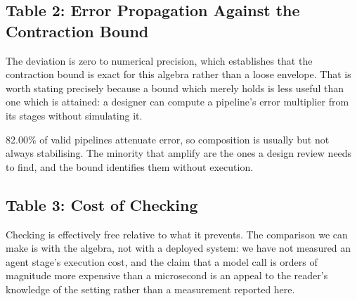 \documentclass[10pt,journal,compsoc,twocolumn]{IEEEtran}
\begin{document}
\subsection{Table 2: Error Propagation Against the Contraction Bound}
\begin{table}[htbp]
\centering
{}
\end{table}

The deviation is zero to numerical precision, which establishes that the contraction bound is exact for this algebra rather than a loose envelope. That is worth stating precisely because a bound which merely holds is less useful than one which is attained: a designer can compute a pipeline's error multiplier from its stages without simulating it.

82.00\% of valid pipelines attenuate error, so composition is usually but not always stabilising. The minority that amplify are the ones a design review needs to find, and the bound identifies them without execution.


\subsection{Table 3: Cost of Checking}
\begin{table}[htbp]
\centering
{}
\end{table}

Checking is effectively free relative to what it prevents. The comparison we can make is with the algebra, not with a deployed system: we have not measured an agent stage's execution cost, and the claim that a model call is orders of magnitude more expensive than a microsecond is an appeal to the reader's knowledge of the setting rather than a measurement reported here.
\end{document}
